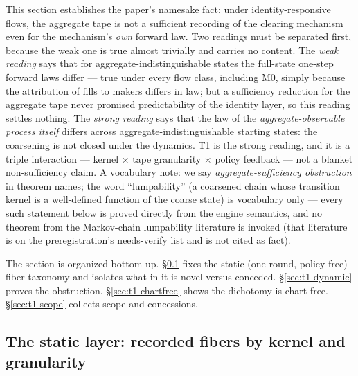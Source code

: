 This section establishes the paper's namesake fact: under identity-responsive
flows, the aggregate tape is not a sufficient recording of the clearing
mechanism even for the mechanism's \emph{own} forward law. Two readings must
be separated first, because the weak one is true almost trivially and carries
no content. The \emph{weak reading} says that for aggregate-indistinguishable
states the full-state one-step forward laws differ --- true under every flow
class, including M0, simply because the attribution of fills to makers
differs in law; but a sufficiency reduction for the aggregate tape never
promised predictability of the identity layer, so this reading settles
nothing. The \emph{strong reading} says that the law of the
\emph{aggregate-observable process itself} differs across
aggregate-indistinguishable starting states: the coarsening is not closed
under the dynamics. T1 is the strong reading, and it is a triple interaction
--- kernel $\times$ tape granularity $\times$ policy feedback --- not a
blanket non-sufficiency claim. A vocabulary note: we say
\emph{aggregate-sufficiency obstruction} in theorem names; the word
``lumpability'' (a coarsened chain whose transition kernel is a well-defined
function of the coarse state) is vocabulary only --- every such statement
below is proved directly from the engine semantics, and no theorem from the
Markov-chain lumpability literature is invoked (that literature is on the
preregistration's needs-verify list and is not cited as fact).

The section is organized bottom-up. \S\ref{sec:t1-static} fixes the static
(one-round, policy-free) fiber taxonomy and isolates what in it is novel
versus conceded. \S\ref{sec:t1-dynamic} proves the obstruction.
\S\ref{sec:t1-chartfree} shows the dichotomy is chart-free.
\S\ref{sec:t1-scope} collects scope and concessions.

\subsection{The static layer: recorded fibers by kernel and granularity}
\label{sec:t1-static}

